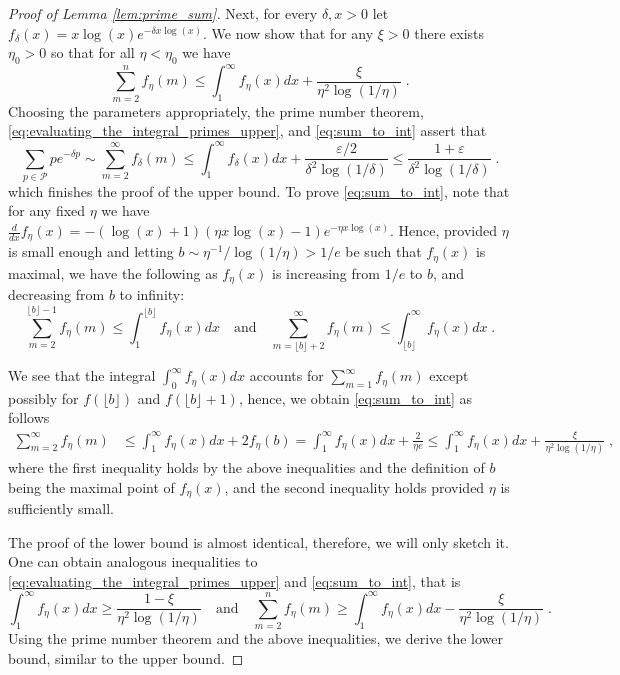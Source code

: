 \documentclass[10pt,a4paper]{amsart}
\begin{document}
\begin{proof}[Proof of Lemma \ref{lem:prime_sum}]
Next, for every $\delta,x>0$ let $f_\delta(x)=x\log(x)e^{-\delta x\log(x)}$. We now show that for any $\xi>0$ there exists $\eta_0>0$ so that for all $\eta<\eta_0$ we have
\begin{equation}\label{eq:sum_to_int}
    \sum_{m=2}^{n} f_\eta(m)\leq \int_{1}^{\infty}f_\eta(x) dx+\frac{\xi}{\eta^2\log(1/\eta)}\;.
\end{equation}
Choosing the parameters appropriately, the prime number theorem, \eqref{eq:evaluating_the_integral_primes_upper}, and \eqref{eq:sum_to_int} assert that
\[
    \sum_{p\in \mathcal{P}}pe^{-\delta p}\sim \sum_{m=2}^{\infty}f_\delta(m)\leq \int_{1}^{\infty}f_{\delta}(x)dx+\frac{\varepsilon/2}{\delta^2\log(1/\delta)}\leq \frac{1+\varepsilon}{\delta^2\log(1/\delta)} \;.
\]
which finishes the proof of the upper bound. To prove \eqref{eq:sum_to_int}, note that for any fixed $\eta$ we have
$\frac{d}{dx}f_\eta(x)=-(\log(x)+1)(\eta x\log(x)-1)e^{-\eta x\log(x)}$.
Hence, provided $\eta$ is small enough and letting $b\sim \eta^{-1}/\log(1/\eta)>1/e$ be such that $f_\eta(x)$ is maximal, we have the following as $f_\eta(x)$ is increasing from $1/e$ to $b$, and decreasing from $b$ to infinity:
\[
    \sum_{m=2}^{\lfloor b \rfloor -1}f_\eta(m)\leq \int_{1}^{\lfloor b\rfloor}f_\eta(x)dx\quad \text{and}\quad \sum_{m=\lfloor b \rfloor+2}^{\infty} f_\eta(m)\leq \int_{\lfloor b\rfloor}^{\infty}f_\eta(x) dx\;.
\]

We see that the integral $\int_{0}^{\infty}f_\eta(x)dx$ accounts for $\sum_{m=1}^{\infty}f_\eta(m)$ except possibly for $f(\lfloor b\rfloor)$ and $f(\lfloor b\rfloor +1)$, hence, we obtain \eqref{eq:sum_to_int} as follows
\begin{align*}
    \sum_{m=2}^{\infty}f_\eta(m)&\leq \int_{1}^{\infty}f_\eta(x)dx+2f_\eta(b)=\int_{1}^{\infty}f_\eta(x)dx+\frac{2}{\eta e}\leq \int_{1}^{\infty}f_\eta(x)dx+\frac{\xi}{\eta^2\log(1/\eta)}\;,
\end{align*}
where the first inequality holds by the above inequalities and the definition of $b$ being the maximal point of $f_\eta(x)$, and the second inequality holds provided $\eta$ is sufficiently small.

The proof of the lower bound is almost identical, therefore, we will only sketch it. One can obtain analogous inequalities to \eqref{eq:evaluating_the_integral_primes_upper} and \eqref{eq:sum_to_int}, that is
\[
    \int_1^{\infty}f_\eta(x)dx\geq \frac{1-\xi}{\eta^2\log(1/\eta)}\quad \text{and}\quad
    \sum_{m=2}^{n} f_\eta(m)\geq \int_{1}^{\infty}f_\eta(x)dx-\frac{\xi}{\eta^2\log(1/\eta)}\;.
\]
Using the prime number theorem and the above inequalities, we derive the lower bound, similar to the upper bound.
\end{proof}
\end{document}
